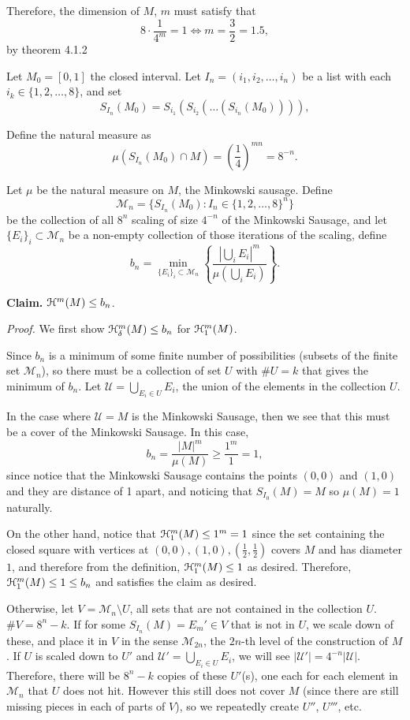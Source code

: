 Therefore, the dimension of \(M\), \(m\) must satisfy that
\[
8 \cdot \frac{1}{4^m} = 1 \iff m = \frac{3}{2} = 1.5,
\]
by theorem 4.1.2

Let \(M_0 = [0, 1]\) the closed interval. Let \(I_n = (i_1, i_2, \ldots, i_n)\) be a list with each \(i_k \in \{1, 2, \ldots, 8\}\), and set
\[
S_{I_n}(M_0) = S_{i_1}\left(S_{i_2}\left(\ldots\left(S_{i_n}(M_0)\right)\right)\right),
\]

Define the natural measure as
\[
\mu(S_{I_n}(M_0) \cap M) = \left(\frac{1}{4}\right)^{mn} = 8^{-n}.
\]

Let \(\mu\) be the natural measure on \(M\), the Minkowski sausage. Define
\[
\mathcal{M}_n = \{S_{I_n}(M_0) : I_n \in \{1, 2, \ldots, 8\}^n\}
\]
be the collection of all \(8^n\) scaling of size \(4^{-n}\) of the Minkowski Sausage, and let \(\{E_i\}_i \subset \mathcal{M}_n\) be a non-empty collection of those iterations of the scaling, define
\[
b_n = \min_{\{E_i\}_i \subset \mathcal{M}_n} \left\{\frac{|\bigcup_i E_i|^m}{\mu(\bigcup_i E_i)}\right\}.
\]

\textbf{Claim.} \(\mathcal{H}^m(M) \leq b_n\).

\textit{Proof.} We first show \(\mathcal{H}_\delta^m(M) \leq b_n\) for \(\mathcal{H}_1^m(M)\).

Since \(b_n\) is a minimum of some finite number of possibilities (subsets of the finite set \(\mathcal{M}_n\)), so there must be a collection of set \(U\) with \(\#U = k\) that gives the minimum of \(b_n\). Let \(\mathcal{U} = \bigcup_{E_i \in U} E_i\), the union of the elements in the collection \(U\).

In the case where \(\mathcal{U} = M\) is the Minkowski Sausage, then we see that this must be a cover of the Minkowski Sausage. In this case,
\[
b_n = \frac{|M|^m}{\mu(M)} \geq \frac{1^m}{1} = 1,
\]
since notice that the Minkowski Sausage contains the points \((0, 0)\) and \((1, 0)\) and they are distance of 1 apart, and noticing that \(S_{I_0} (M) = M\) so \(\mu(M) = 1\) naturally.

On the other hand, notice that \(\mathcal{H}_{1}^m(M) \leq 1^m = 1\) since the set containing the closed square with vertices at \((0, 0), (1, 0), \left(\frac{1}{2}, \frac{1}{2}\right)\) covers \(M\) and has diameter \(1\), and therefore from the definition, \(\mathcal{H}_{1}^m(M) \leq 1\) as desired. Therefore, \(\mathcal{H}_1^m(M) \leq 1 \leq b_n\) and satisfies the claim as desired.

Otherwise, let \(V = \mathcal{M}_n \setminus U\), all sets that are not contained in the collection \(U\). \(\# V = 8^n - k\). If for some \(S_{I_n} (M) = E_{m}' \in V\) that is not in \(U\), we scale down of these, and place it in \(V\) in the sense \(\mathcal{M}_{2n}\), the \(2n\)-th level of the construction of \(M\). If \(U\) is scaled down to \(U'\) and \(\mathcal{U}' = \bigcup_{E_i \in U} E_i\), we will see \(|\mathcal{U}'| = 4^{-n}|\mathcal{U}|\). Therefore, there will be \(8^n - k\) copies of these \(U'\)(s), one each for each element in \(\mathcal{M}_n\) that \(U\) does not hit. However this still does not cover \(M\) (since there are still missing pieces in each of parts of \(V\)), so we repeatedly create \(U''\), \(U'''\), etc.

